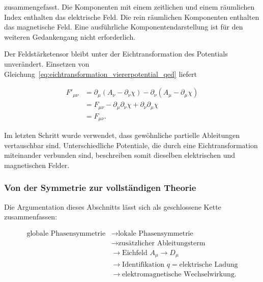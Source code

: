 zusammengefasst. Die Komponenten mit einem zeitlichen und einem
räumlichen Index enthalten das elektrische Feld. Die rein räumlichen
Komponenten enthalten das magnetische Feld. Eine ausführliche
Komponentendarstellung ist für den weiteren Gedankengang nicht
erforderlich.

Der Feldstärketensor bleibt unter der Eichtransformation des Potentials
unverändert. Einsetzen von
Gleichung~\eqref{eq:eichtransformation_viererpotential_qed} liefert

\begin{equation}
	\begin{aligned}
		F'_{\mu\nu}
		&=
		\partial_\mu
		\left(A_\nu-\partial_\nu\chi\right)
		-
		\partial_\nu
		\left(A_\mu-\partial_\mu\chi\right)
		\\[4pt]
		&=
		F_{\mu\nu}
		-
		\partial_\mu\partial_\nu\chi
		+
		\partial_\nu\partial_\mu\chi
		\\[4pt]
		&=
		F_{\mu\nu}.
	\end{aligned}
	\label{eq:feldstaerketensor_eichinvariant_qed}
\end{equation}

Im letzten Schritt wurde verwendet, dass gewöhnliche partielle
Ableitungen vertauschbar sind. Unterschiedliche Potentiale, die durch
eine Eichtransformation miteinander verbunden sind, beschreiben somit
dieselben elektrischen und magnetischen Felder.

\subsubsection*{Von der Symmetrie zur vollständigen Theorie}

Die Argumentation dieses Abschnitts lässt sich als geschlossene Kette
zusammenfassen:

\begin{equation}
	\begin{aligned}
		\text{globale Phasensymmetrie}
		&\longrightarrow
		\text{lokale Phasensymmetrie}
		\\
		&\longrightarrow
		\text{zusätzlicher Ableitungsterm}
		\\
		&\longrightarrow
		\text{Eichfeld }A_\mu
		\longrightarrow
		D_\mu
		\\
		&\longrightarrow
		\text{Identifikation }q=\text{elektrische Ladung}
		\\
		&\longrightarrow
		\text{elektromagnetische Wechselwirkung}.
	\end{aligned}
	\label{eq:leitstruktur_eichsymmetrie_qed}
\end{equation}

